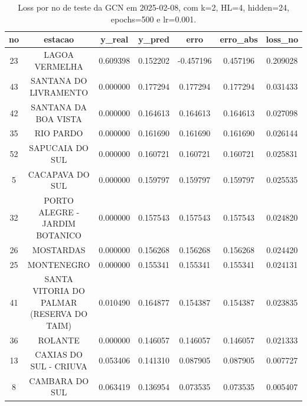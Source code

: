 \begin{table}[h]
\centering
\caption{Loss por no de teste da GCN em 2025-02-08, com k=2, HL=4, hidden=24, epochs=500 e lr=0.001.}
\label{tab:gcn_loss_k2_hl4_h24_e500_d20250208}
\begin{tabular}{ccccccc}
\toprule
no & estacao & y\_real & y\_pred & erro & erro\_abs & loss\_no \\
\midrule
23 & LAGOA VERMELHA & 0.609398 & 0.152202 & -0.457196 & 0.457196 & 0.209028 \\
43 & SANTANA DO LIVRAMENTO & 0.000000 & 0.177294 & 0.177294 & 0.177294 & 0.031433 \\
42 & SANTANA DA BOA VISTA & 0.000000 & 0.164613 & 0.164613 & 0.164613 & 0.027098 \\
35 & RIO PARDO & 0.000000 & 0.161690 & 0.161690 & 0.161690 & 0.026144 \\
52 & SAPUCAIA DO SUL & 0.000000 & 0.160721 & 0.160721 & 0.160721 & 0.025831 \\
5 & CACAPAVA DO SUL & 0.000000 & 0.159797 & 0.159797 & 0.159797 & 0.025535 \\
32 & PORTO ALEGRE - JARDIM BOTANICO & 0.000000 & 0.157543 & 0.157543 & 0.157543 & 0.024820 \\
26 & MOSTARDAS & 0.000000 & 0.156268 & 0.156268 & 0.156268 & 0.024420 \\
25 & MONTENEGRO & 0.000000 & 0.155341 & 0.155341 & 0.155341 & 0.024131 \\
41 & SANTA VITORIA DO PALMAR (RESERVA DO TAIM) & 0.010490 & 0.164877 & 0.154387 & 0.154387 & 0.023835 \\
36 & ROLANTE & 0.000000 & 0.146057 & 0.146057 & 0.146057 & 0.021333 \\
13 & CAXIAS DO SUL - CRIUVA & 0.053406 & 0.141310 & 0.087905 & 0.087905 & 0.007727 \\
8 & CAMBARA DO SUL & 0.063419 & 0.136954 & 0.073535 & 0.073535 & 0.005407 \\
\bottomrule
\end{tabular}
\end{table}
